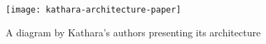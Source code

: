 \begin{figure}
  \centering
  \texttt{[image: kathara-architecture-paper]}
  \caption{A diagram by Kathara's authors presenting its architecture}
  \label{fig:kathara-architecture-paper}
\end{figure}
